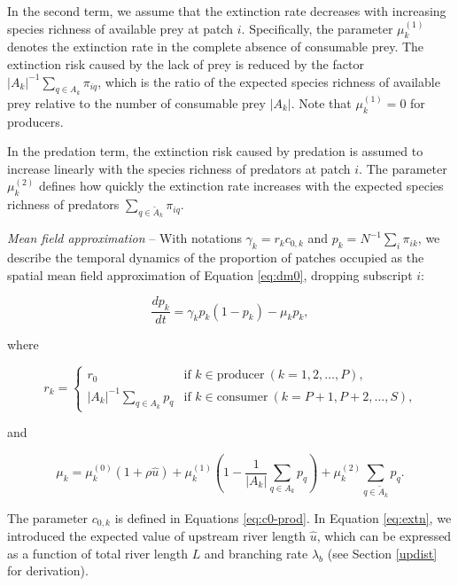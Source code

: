 \documentclass[11pt, class=article, crop=false]{standalone}
\theoremstyle{definition}
\begin{document}
In the second term, we assume that the extinction rate decreases with increasing species richness of available prey at patch $i$.
Specifically, the parameter $\mu_{k}^{(1)}$ denotes the extinction rate in the complete absence of consumable prey.
The extinction risk caused by the lack of prey is reduced by the factor $|A_k|^{-1} \sum_{q \in A_{k}} \pi_{iq}$, which is the ratio of the expected species richness of available prey relative to the number of consumable prey $|A_k|$.
Note that $\mu_{k}^{(1)} = 0$ for producers.

In the predation term, the extinction risk caused by predation is assumed to increase linearly with the species richness of predators at patch $i$.
The parameter $\mu_{k}^{(2)}$ defines how quickly the extinction rate increases with the expected species richness of predators $\sum_{q \in \tilde{A}_k} \pi_{iq}$.

\textit{Mean field approximation} --
With notations $\gamma_k = r_{k} c_{0, k}$ and $p_k = N^{-1} \sum_i \pi_{ik}$, we describe the temporal dynamics of the proportion of patches occupied as the spatial mean field approximation of Equation \ref{eq:dm0}, dropping subscript $i$:

\begin{equation}
    \frac{dp_k}{dt} = \gamma_k p_{k} (1 - p_{k}) - \mu_{k} p_{k},
    \label{eq:master}
\end{equation}

where

\begin{equation}
    r_{k} = 
    \begin{cases}
        r_0 & \text{if $k \in \text{producer}~(k = 1, 2, \ldots, P)$,}\\
        |A_k|^{-1} \sum_{q \in A_k} p_{q} & \text{if $k \in \text{consumer}~(k = P + 1, P + 2, \ldots, S)$,}
    \end{cases}
\end{equation}

and

\begin{equation}
    \mu_{k} = 
        \mu_{k}^{(0)} (1 + \rho \hat{u}) + 
        \mu_{k}^{(1)} \left(1 - \frac{1}{|A_k|}\sum_{q \in A_k} p_{q} \right) + 
        \mu_{k}^{(2)} \sum_{q \in \tilde{A}_k} p_{q}.
    \label{eq:extn}    
\end{equation}

The parameter $c_{0, k}$ is defined in Equations \ref{eq:c0-prod}. 
In Equation \ref{eq:extn}, we introduced the expected value of upstream river length $\hat{u}$, which can be expressed as a function of total river length $L$ and branching rate $\lambda_b$ (see Section \ref{updist} for derivation).
\end{document}
